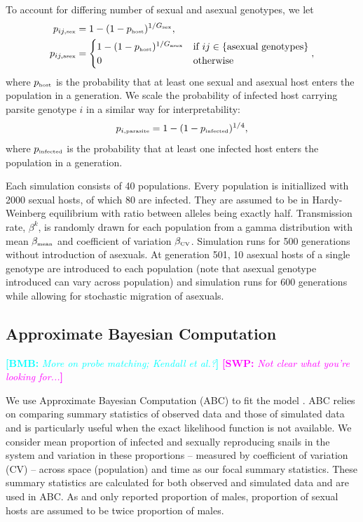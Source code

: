 \documentclass{article}\usepackage[]{graphicx}\usepackage[]{color}
\newcommand{\comment}[3]{\textcolor{#1}{\textbf{[#2: }\textit{#3}\textbf{]}}}
\newcommand{\bmb}[1]{\comment{cyan}{BMB}{#1}}
\newcommand{\swp}[1]{\comment{magenta}{SWP}{#1}}
\begin{document}
To account for differing number of sexual and asexual genotypes, we let 
\begin{equation}
\begin{aligned}
p_{ij, \textrm{\tiny sex}} &= 1-(1-p_{\textrm{\tiny host}})^{1/G_\textrm{\tiny sex}},\\
p_{ij, \textrm{\tiny asex}} &=
\begin{cases}
1-(1-p_{\textrm{\tiny host}})^{1/G_\textrm{\tiny asex}} & \text{if } ij \in \{\text{asexual genotypes}\} \\
0 & \text{otherwise}
\end{cases},
\end{aligned}
\end{equation}
where $p_{\textrm{\tiny host}}$ is the probability that at least one sexual and asexual host enters the population in a generation. We scale the probability of infected host carrying parsite genotype $i$ in a similar way for interpretability:
\begin{equation}
p_{i, \textrm{\tiny parasite}} = 1 - (1-p_{\textrm{\tiny infected}})^{1/4},
\end{equation}
where $p_{\textrm{\tiny infected}}$ is the probability that at least one infected host enters the population in a generation.

Each simulation consists of 40 populations. Every population is initiallized with 2000 sexual hosts, of which 80 are infected. 
They are assumed to be in Hardy-Weinberg equilibrium with ratio between alleles being exactly half. 
Transmission rate, $\beta^k$, is randomly drawn for each population from a gamma distribution with mean $\beta_{\textrm{\tiny mean}}$ and coefficient of variation $\beta_{\textrm{\tiny CV}}$. 
Simulation runs for 500 generations without introduction of asexuals. At generation 501, 10 asexual hosts of a single genotype are introduced to each population (note that asexual genotype introduced can vary across population) and simulation runs for 600 generations while allowing for stochastic migration of asexuals.

\subsection{Approximate Bayesian Computation}

\bmb{More on probe matching; Kendall et al.?}
\swp{Not clear what you're looking for...}

We use Approximate Bayesian Computation (ABC) to fit the model \citep{toni2009approximate}.
ABC relies on comparing summary statistics of observed data and those of simulated data and is particularly useful when the exact likelihood function is not available.
We consider mean proportion of infected and sexually reproducing snails in the system and variation in these proportions -- measured by coefficient of variation (CV) -- across space (population) and time as our focal summary statistics.
These summary statistics are calculated for both observed and simulated data and are used in ABC.
As \cite{dagan2013clonal} and \cite{mckone2016fine} only reported proportion of males, proportion of sexual hosts are assumed to be twice proportion of males.
\end{document}
